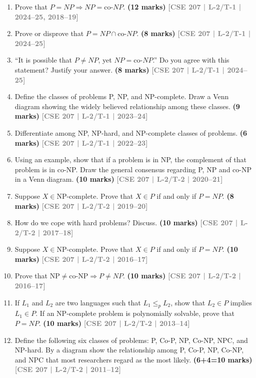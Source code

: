 \documentclass[12pt]{article}
\newcommand{\yr}[1]{\hfill\textcolor{gray}{\small\textbf{[#1]}}}
\newcommand{\mk}[1]{\textcolor{orange!70!black}{\small\textbf{(#1 marks)}}}
\begin{document}
\begin{enumerate}

\item Prove that $P = NP \Rightarrow NP = \text{co-}NP$.
\mk{12} \yr{CSE 207 | L-2/T-1 | 2024--25, 2018--19}


\item Prove or disprove that $P = NP \cap \text{co-}NP$.
\mk{8} \yr{CSE 207 | L-2/T-1 | 2024--25}


\item ``It is possible that $P \neq NP$, yet $NP = \text{co-}NP$.'' Do you agree with this statement? Justify your answer.
\mk{8} \yr{CSE 207 | L-2/T-1 | 2024--25}


\item Define the classes of problems P, NP, and NP-complete. Draw a Venn diagram showing the widely believed relationship among these classes.
\mk{9} \yr{CSE 207 | L-2/T-1 | 2023--24}


\item Differentiate among NP, NP-hard, and NP-complete classes of problems.
\mk{6} \yr{CSE 207 | L-2/T-1 | 2022--23}


\item Using an example, show that if a problem is in NP, the complement of that problem is in co-NP. Draw the general consensus regarding P, NP and co-NP in a Venn diagram.
\mk{10} \yr{CSE 207 | L-2/T-2 | 2020--21}


\item Suppose $X \in \text{NP-complete}$. Prove that $X \in P$ if and only if $P = NP$.
\mk{8} \yr{CSE 207 | L-2/T-2 | 2019--20}


\item How do we cope with hard problems? Discuss. \mk{10}
\yr{CSE 207 | L-2/T-2 | 2017--18}


\item Suppose $X \in \text{NP-complete}$. Prove that $X \in P$ if and only if $P = NP$. \mk{10}
\yr{CSE 207 | L-2/T-2 | 2016--17}


\item Prove that $\text{NP} \neq \text{co-NP} \Rightarrow P \neq NP$. \mk{10}
\yr{CSE 207 | L-2/T-2 | 2016--17}


\item If $L_1$ and $L_2$ are two languages such that $L_1 \leq_p L_2$, show that $L_2 \in P$ implies $L_1 \in P$. If an NP-complete problem is polynomially solvable, prove that $P = NP$. \mk{10}
\yr{CSE 207 | L-2/T-2 | 2013--14}


\item Define the following six classes of problems: P, Co-P, NP, Co-NP, NPC, and NP-hard. By a diagram show the relationship among P, Co-P, NP, Co-NP, and NPC that most researchers regard as the most likely. \mk{6+4=10}
\yr{CSE 207 | L-2/T-2 | 2011--12}


\end{enumerate}
\end{document}
